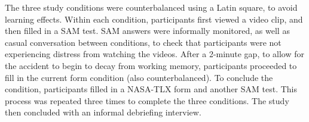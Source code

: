 \documentclass[../main/Feedback.tex]{subfiles}
\begin{document}
The three study conditions were counterbalanced using a Latin square, to avoid learning effects. Within each condition, participants first viewed a video clip, and then filled in a SAM test. SAM answers were informally monitored, as well as casual conversation between conditions, to check that participants were not experiencing distress from watching the videos. After a 2-minute gap, to allow for the accident to begin to decay from working memory, participants proceeded to fill in the current form condition (also counterbalanced). To conclude the condition, participants filled in a NASA-TLX form and another SAM test.
This process was repeated three times to complete the three conditions.
The study then concluded with an informal debriefing interview.
\end{document}
